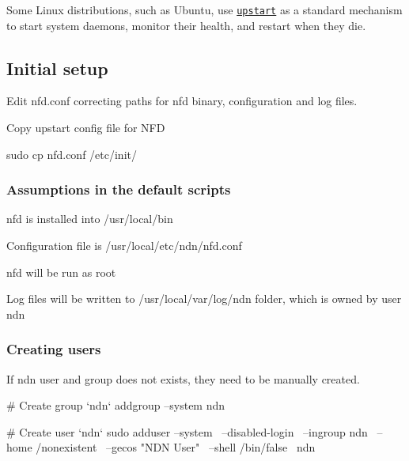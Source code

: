 Some Linux distributions, such as Ubuntu, use \href{http://upstart.ubuntu.com/}{\tt upstart} as a standard mechanism to start system daemons, monitor their health, and restart when they die.

\subsection*{Initial setup }


\begin{DoxyItemize}
\item Edit {\ttfamily nfd.\+conf} correcting paths for {\ttfamily nfd} binary, configuration and log files.
\item Copy upstart config file for N\+FD \begin{DoxyVerb}  sudo cp nfd.conf /etc/init/
\end{DoxyVerb}

\end{DoxyItemize}

\subsubsection*{Assumptions in the default scripts}


\begin{DoxyItemize}
\item {\ttfamily nfd} is installed into {\ttfamily /usr/local/bin}
\item Configuration file is {\ttfamily /usr/local/etc/ndn/nfd.conf}
\item {\ttfamily nfd} will be run as root
\item Log files will be written to {\ttfamily /usr/local/var/log/ndn} folder, which is owned by user {\ttfamily ndn}
\end{DoxyItemize}

\subsubsection*{Creating users}

If {\ttfamily ndn} user and group does not exists, they need to be manually created. \begin{DoxyVerb}# Create group `ndn`
addgroup --system ndn

# Create user `ndn`
sudo adduser --system \
             --disabled-login \
             --ingroup ndn \
             --home /nonexistent \
             --gecos "NDN User" \
             --shell /bin/false \
             ndn
\end{DoxyVerb}


